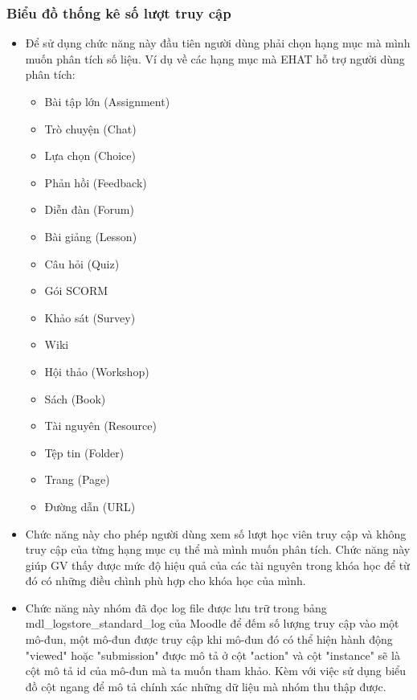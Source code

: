 \subsubsection{Biểu đồ thống kê số lượt truy cập}
\begin{itemize}
	\item Để sử dụng chức năng này đầu tiên người dùng phải chọn hạng mục mà mình muốn phân tích số liệu. Ví dụ về các hạng mục mà EHAT hỗ trợ người dùng phân tích:
	
	\begin{itemize}
		\item Bài tập lớn (Assignment)
		\item Trò chuyện (Chat)
		\item Lựa chọn (Choice)
		\item Phản hồi (Feedback)
		\item Diễn đàn (Forum)
		\item Bài giảng (Lesson)
		\item Câu hỏi (Quiz)
		\item Gói SCORM
		\item Khảo sát (Survey)
		\item Wiki
		\item Hội thảo (Workshop)
		\item Sách (Book)
		\item Tài nguyên (Resource)
		\item Tệp tin (Folder)
		\item Trang (Page)
		\item Đường dẫn (URL)
	\end{itemize}

	\item Chức năng này cho phép người dùng xem số lượt học viên truy cập và không truy cập của từng hạng mục cụ thể mà mình muốn phân tích. Chức năng này giúp GV thấy được mức độ hiệu quả của các tài nguyên trong khóa học để từ đó có những điều chình phù hợp cho khóa học của mình.
	
	\item Chức năng này nhóm đã đọc log file được lưu trữ trong bảng mdl\_logstore\_standard\_log của Moodle để đếm số lượng truy cập vào một mô-đun, một mô-đun được truy cập khi mô-đun đó có thể hiện hành động "viewed" hoặc "submission" được mô tả ở cột "action" và cột "instance" sẽ là cột mô tả id của mô-đun mà ta muốn tham khảo. Kèm với việc sử dụng biểu đồ cột ngang để mô tả chính xác những dữ liệu mà nhóm thu thập được.
\end{itemize}

